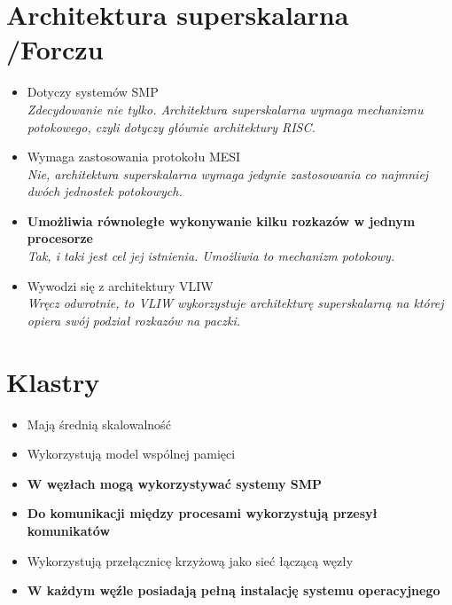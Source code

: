 \documentclass[a4paper,twoside]{article}
\begin{document}
\section{Architektura superskalarna {\small /Forczu}}
	\begin{itemize}
    \item Dotyczy systemów SMP\\
    {\small \emph{Zdecydowanie nie tylko. Architektura superskalarna wymaga mechanizmu potokowego, czyli dotyczy głównie architektury RISC.}}
    \item Wymaga zastosowania protokołu MESI\\
    {\small \emph{Nie, architektura superskalarna wymaga jedynie zastosowania co najmniej dwóch jednostek potokowych.}}
    \item \textbf{Umożliwia równoległe wykonywanie kilku rozkazów w jednym procesorze}\\
    {\small \emph{Tak, i taki jest cel jej istnienia. Umożliwia to mechanizm potokowy.}}
    \item Wywodzi się z architektury VLIW\\
    {\small \emph{Wręcz odwrotnie, to VLIW wykorzystuje architekturę superskalarną na której opiera swój podział rozkazów na paczki.}}
    \end{itemize}

\section{Klastry}
	\begin{itemize}
    \item Mają średnią skalowalność
    \item Wykorzystują model wspólnej pamięci
    \item \textbf{W węzłach mogą wykorzystywać systemy SMP}
    \item \textbf{Do komunikacji między procesami wykorzystują przesył komunikatów}
    \item Wykorzystują przełącznicę krzyżową jako sieć łączącą węzły
    \item \textbf{W każdym węźle posiadają pełną instalację systemu operacyjnego}
    \end{itemize}
\end{document}
